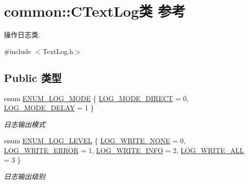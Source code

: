 \hypertarget{classcommon_1_1_c_text_log}{\section{common\+:\+:C\+Text\+Log类 参考}
\label{classcommon_1_1_c_text_log}
}


操作日志类.  




{\ttfamily \#include $<$Text\+Log.\+h$>$}

\subsection*{Public 类型}
\begin{DoxyCompactItemize}
\item 
enum \hyperlink{classcommon_1_1_c_text_log_ab0c8fabb54ada6443cadd1fbfe65cf2e}{E\+N\+U\+M\+\_\+\+L\+O\+G\+\_\+\+M\+O\+D\+E} \{ \hyperlink{classcommon_1_1_c_text_log_ab0c8fabb54ada6443cadd1fbfe65cf2eaa76de1b0920b606311d0d521477a0731}{L\+O\+G\+\_\+\+M\+O\+D\+E\+\_\+\+D\+I\+R\+E\+C\+T} = 0, 
\hyperlink{classcommon_1_1_c_text_log_ab0c8fabb54ada6443cadd1fbfe65cf2ea1e90774c6da95492d7d46f9434c7fbde}{L\+O\+G\+\_\+\+M\+O\+D\+E\+\_\+\+D\+E\+L\+A\+Y} = 1
 \}
\begin{DoxyCompactList}\small\item\em 日志输出模式 \end{DoxyCompactList}\item 
enum \hyperlink{classcommon_1_1_c_text_log_ae22e9f5eba143051e1193e62caf63aee}{E\+N\+U\+M\+\_\+\+L\+O\+G\+\_\+\+L\+E\+V\+E\+L} \{ \hyperlink{classcommon_1_1_c_text_log_ae22e9f5eba143051e1193e62caf63aeea739a7f4691e3b1be02413e0a4d552003}{L\+O\+G\+\_\+\+W\+R\+I\+T\+E\+\_\+\+N\+O\+N\+E} = 0, 
\hyperlink{classcommon_1_1_c_text_log_ae22e9f5eba143051e1193e62caf63aeeac94e3280bfd3f0db406af28530143da1}{L\+O\+G\+\_\+\+W\+R\+I\+T\+E\+\_\+\+E\+R\+R\+O\+R} = 1, 
\hyperlink{classcommon_1_1_c_text_log_ae22e9f5eba143051e1193e62caf63aeea82cd6c1e7f3371a99033a06cdaf23a81}{L\+O\+G\+\_\+\+W\+R\+I\+T\+E\+\_\+\+I\+N\+F\+O} = 2, 
\hyperlink{classcommon_1_1_c_text_log_ae22e9f5eba143051e1193e62caf63aeea7ab4c59a70fe3bf1c63c45e7183a0326}{L\+O\+G\+\_\+\+W\+R\+I\+T\+E\+\_\+\+A\+L\+L} = 3
 \}
\begin{DoxyCompactList}\small\item\em 日志输出级别 \end{DoxyCompactList}\end{DoxyCompactItemize}
